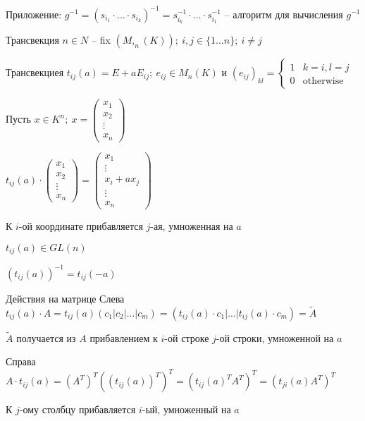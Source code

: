 \documentclass[12pt]{article}
\begin{document}
Приложение: $g^{-1} = (s_{i_1} \cdot \ldots \cdot s_{i_k})^{-1} = s_{i_k}^{-1} \cdot \ldots \cdot s_{i_1}^{-1}$ -- алгоритм для вычисления $g^{-1}$

\begin{defin}{Трансвекция}
    $n \in N$ -- fix $(M,_n(K));\ i, j \in \{1 \ldots n\};\ i \ne j$

    Трансвекциея $t_{ij}(a) = E + aE_{ij};\ e_{ij} \in M_n(K)$ и $(e_{ij})_{kl} = \begin{cases}
        1 & k = i, l = j \\
        0 & \text{otherwise}
    \end{cases}$
\end{defin}

\begin{Example}{}
    Пусть $x \in K^n;\ x = \begin{pmatrix}
        x_1 \\
        x_2 \\
        \vdots \\
        x_n
    \end{pmatrix}$
    
    $t_{ij}(a) \cdot \begin{pmatrix}
        x_1 \\
        x_2 \\
        \vdots \\
        x_n
    \end{pmatrix} = \begin{pmatrix}
        x_1 \\
        \vdots \\
        x_i + ax_j \\
        \vdots \\
        x_n
    \end{pmatrix}$

    К $i$-ой координате прибавляется $j$-ая, умноженная на $a$

    $t_{ij}(a) \in GL(n)$

    $(t_{ij}(a))^{-1} = t_{ij}(-a)$
\end{Example}

\begin{Example}{Действия на матрице}
    Слева $t_{ij}(a) \cdot A = t_{ij}(a)(c_1 | c_2 | \ldots | c_m) = (t_{ij}(a) \cdot c_1 | \ldots | t_{ij}(a) \cdot c_m) = \tilde{A}$

    $\tilde{A}$ получается из $A$ прибавлением к $i$-ой строке $j$-ой строки, умноженной на $a$

    Справа $A \cdot t_{ij}(a) = (A^T)^T((t_{ij}(a))^T)^T = (t_{ij}(a)^TA^T)^T = (t_{ji}(a)A^T)^T$

    К $j$-ому столбцу прибавляется $i$-ый, умноженный на $a$
\end{Example}
\end{document}
